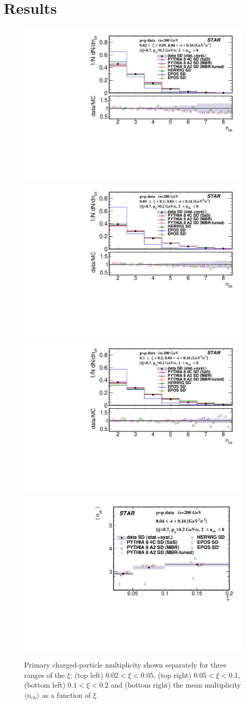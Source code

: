 \section{Results}\label{section:star_results}

\begin{figure}[bh]
	\centering
	\includegraphics[width=.49\textwidth,page=1]{chapters/chrgSTAR/img/results/nch_ksi_0.pdf}
	\hfill
	\includegraphics[width=.49\textwidth,page=1]{chapters/chrgSTAR/img/results/nch_ksi_1.pdf}
	\newline
	\includegraphics[width=.49\textwidth,page=1]{chapters/chrgSTAR/img/results/nch_ksi_2.pdf}
	\hfill
	\includegraphics[width=.49\textwidth,page=1]{chapters/chrgSTAR/img/results/mean_nch_xi.pdf}
	\caption[Primary charged-particle multiplicity shown separately for three ranges of the $\xi$  and the mean multiplicity $\langle n_{ch}\rangle$ as a function of $\xi$.]{Primary charged-particle multiplicity shown separately for three ranges of the $\xi$: (top left) $0.02<\xi<0.05$, (top right) $0.05<\xi<0.1$, (bottom left) $0.1<\xi<0.2$ and (bottom right) the mean multiplicity $\langle n_{ch}\rangle$ as a function of $\xi$.}
	\label{results_star_nch}
\end{figure}

